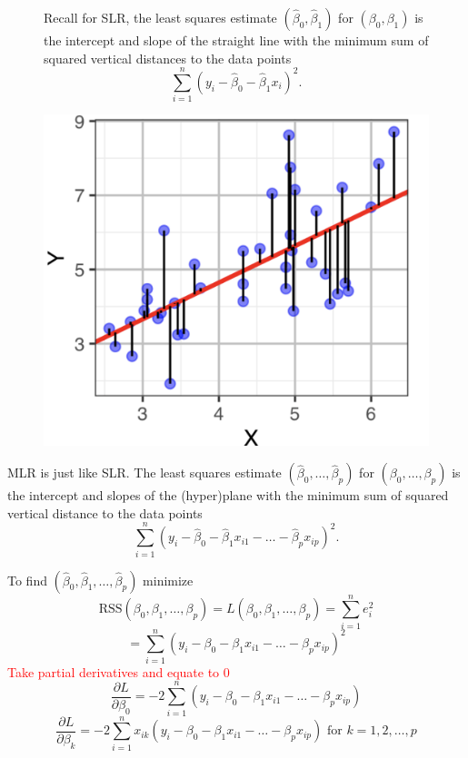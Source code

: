 \documentclass[14pt]{extarticle}
\begin{document}
\begin{figure}[H]
    \centering
    \begin{minipage}{0.5\textwidth}
        \vspace*{0.01\textheight}
        \raggedright 
        Recall for SLR, the least squares estimate $(\hat{\beta}_0, \hat{\beta}_1)$ for $(\beta_0, \beta_1)$ is the intercept and slope of the straight line with the minimum sum of squared vertical distances to the data points
        \[
        \sum_{i=1}^{n} (y_i - \hat{\beta}_0 - \hat{\beta}_1 x_i)^2.
        \]
    \end{minipage}
    \hfill
    \begin{minipage}{0.45\textwidth}
        \includegraphics[width=\textwidth]{fig10.png}
    \end{minipage}
\end{figure}

\noindent
MLR is just like SLR. The least squares estimate $(\hat{\beta}_0, \dots, \hat{\beta}_p)$ for $(\beta_0, \dots, \beta_p)$ is the intercept and slopes of the (hyper)plane with the minimum sum of squared vertical distance to the data points
\[
\sum_{i=1}^{n} (y_i - \hat{\beta}_0 - \hat{\beta}_1 x_{i1} - \dots - \hat{\beta}_p x_{ip})^2.
\]

\noindent
To find $(\hat{\beta}_0, \hat{\beta}_1, \dots, \hat{\beta}_p)$ minimize
\[
\text{RSS}(\beta_0, \beta_1, \dots, \beta_p)
= L(\beta_0, \beta_1, \dots, \beta_p)
= \sum_{i=1}^{n} e_i^2\]
\[
= \sum_{i=1}^{n} (y_i - \beta_0 - \beta_1 x_{i1} - \dots - \beta_p x_{ip})^2
\]
\noindent
\textcolor{red}{Take partial derivatives and equate to 0}
\[
\frac{\partial L}{\partial \beta_0} = -2 \sum_{i=1}^{n} (y_i - \beta_0 - \beta_1 x_{i1} - \dots - \beta_p x_{ip})
\]
\[
\frac{\partial L}{\partial \beta_k} = -2 \sum_{i=1}^{n} x_{ik} (y_i - \beta_0 - \beta_1 x_{i1} - \dots - \beta_p x_{ip})
\text{ for } k = 1, 2, \dots, p
\]
\end{document}
